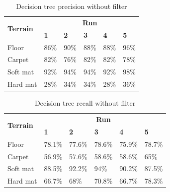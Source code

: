 \documentclass[USenglish]{ifimaster}  %
\begin{document}
\begin{table}[h]
	\centering
	\begin{tabular}{@{}llllll@{}}
		\toprule
		\multirow{2}{*}{\textbf{Terrain}} & \multicolumn{5}{c}{\textbf{Run}} \\ \cmidrule(l){2-6} 
		& \multicolumn{1}{l|}{\textbf{1}} & \multicolumn{1}{l|}{\textbf{2}} & \multicolumn{1}{l|}{\textbf{3}} & \multicolumn{1}{l|}{\textbf{4}} & \textbf{5} \\ \midrule
		\multicolumn{1}{l|}{Floor} & \multicolumn{1}{l|}{86\%} & \multicolumn{1}{l|}{90\%} & \multicolumn{1}{l|}{88\%} & \multicolumn{1}{l|}{88\%} & 96\% \\ \midrule
		\multicolumn{1}{l|}{Carpet} & \multicolumn{1}{l|}{82\%} & \multicolumn{1}{l|}{76\%} & \multicolumn{1}{l|}{82\%} & \multicolumn{1}{l|}{82\%} & 78\% \\ \midrule
		\multicolumn{1}{l|}{Soft mat} & \multicolumn{1}{l|}{92\%} & \multicolumn{1}{l|}{94\%} & \multicolumn{1}{l|}{94\%} & \multicolumn{1}{l|}{92\%} & 98\% \\ \midrule
		\multicolumn{1}{l|}{Hard mat} & \multicolumn{1}{l|}{28\%} & \multicolumn{1}{l|}{34\%} & \multicolumn{1}{l|}{34\%} & \multicolumn{1}{l|}{28\%} & 36\% \\ \bottomrule
	\end{tabular}
	\caption{Decision tree precision without filter}
	\label{dt1Precision}
\end{table}
\FloatBarrier
\begin{table}[h]
	\centering
	\begin{tabular}{@{}llllll@{}}
		\toprule
		\multirow{2}{*}{\textbf{Terrain}} & \multicolumn{5}{c}{\textbf{Run}} \\ \cmidrule(l){2-6} 
		& \multicolumn{1}{l|}{\textbf{1}} & \multicolumn{1}{l|}{\textbf{2}} & \multicolumn{1}{l|}{\textbf{3}} & \multicolumn{1}{l|}{\textbf{4}} & \textbf{5} \\ \midrule
		\multicolumn{1}{l|}{Floor} & \multicolumn{1}{l|}{78.1\%} & \multicolumn{1}{l|}{77.6\%} & \multicolumn{1}{l|}{78.6\%} & \multicolumn{1}{l|}{75.9\%} & 78.7\% \\ \midrule
		\multicolumn{1}{l|}{Carpet} & \multicolumn{1}{l|}{56.9\%} & \multicolumn{1}{l|}{57.6\%} & \multicolumn{1}{l|}{58.6\%} & \multicolumn{1}{l|}{58.6\%} & 65\% \\ \midrule
		\multicolumn{1}{l|}{Soft mat} & \multicolumn{1}{l|}{88.5\%} & \multicolumn{1}{l|}{92.2\%} & \multicolumn{1}{l|}{94\%} & \multicolumn{1}{l|}{90.2\%} & 87.5\% \\ \midrule
		\multicolumn{1}{l|}{Hard mat} & \multicolumn{1}{l|}{66.7\%} & \multicolumn{1}{l|}{68\%} & \multicolumn{1}{l|}{70.8\%} & \multicolumn{1}{l|}{66.7\%} & 78.3\% \\ \bottomrule
	\end{tabular}
	\caption{Decision tree recall without filter}
	\label{dt1recall}
\end{table}
\FloatBarrier
\end{document}
